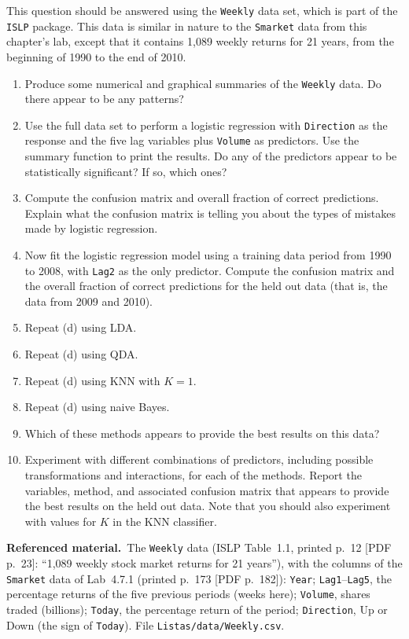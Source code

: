 \documentclass[11pt,a4paper]{article}
\numberwithin{equation}{questao}   %
\newenvironment{refmat}{\par\smallskip\noindent\begin{small}\textbf{Referenced material.}\ }{\end{small}\par\smallskip}
\begin{document}
This question should be answered using the \texttt{Weekly} data set, which is part of the
\texttt{ISLP} package. This data is similar in nature to the \texttt{Smarket} data from this
chapter's lab, except that it contains 1,089 weekly returns for 21 years, from the beginning of
1990 to the end of 2010.
\begin{enumerate}[label=(\alph*)]
\item Produce some numerical and graphical summaries of the \texttt{Weekly} data. Do there appear to be any patterns?
\item Use the full data set to perform a logistic regression with \texttt{Direction} as the
response and the five lag variables plus \texttt{Volume} as predictors. Use the summary function
to print the results. Do any of the predictors appear to be statistically significant? If so, which ones?
\item Compute the confusion matrix and overall fraction of correct predictions. Explain what the
confusion matrix is telling you about the types of mistakes made by logistic regression.
\item Now fit the logistic regression model using a training data period from 1990 to 2008, with
\texttt{Lag2} as the only predictor. Compute the confusion matrix and the overall fraction of
correct predictions for the held out data (that is, the data from 2009 and 2010).
\item Repeat (d) using LDA.
\item Repeat (d) using QDA.
\item Repeat (d) using KNN with $K=1$.
\item Repeat (d) using naive Bayes.
\item Which of these methods appears to provide the best results on this data?
\item Experiment with different combinations of predictors, including possible transformations
and interactions, for each of the methods. Report the variables, method, and associated
confusion matrix that appears to provide the best results on the held out data. Note that you
should also experiment with values for $K$ in the KNN classifier.
\end{enumerate}
\begin{refmat}The \texttt{Weekly} data (ISLP Table~1.1, printed p.~12 [PDF p.~23]: ``1,089 weekly stock
market returns for 21 years''), with the columns of the \texttt{Smarket} data of Lab~4.7.1 (printed
p.~173 [PDF p.~182]): \texttt{Year}; \texttt{Lag1}--\texttt{Lag5}, the percentage returns of the five
previous periods (weeks here); \texttt{Volume}, shares traded (billions); \texttt{Today}, the percentage
return of the period; \texttt{Direction}, Up or Down (the sign of \texttt{Today}). File
\texttt{Listas/data/Weekly.csv}.\end{refmat}
\end{document}
